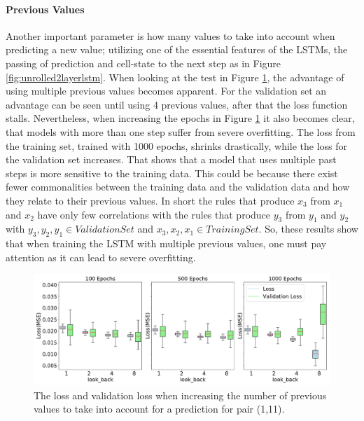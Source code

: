 \paragraph{Previous Values}
Another important parameter is how many values to take into account when predicting a new value; utilizing one of the essential features of the LSTMs, the passing of prediction and cell-state to the next step as in Figure \ref{fig:unrolled2layerlstm}.
When looking at the test in Figure \ref{fig:experiment_2}, the advantage of using multiple previous values becomes apparent.
For the validation set an advantage can be seen until using 4 previous values, after that the loss function stalls.
Nevertheless, when increasing the epochs in Figure \ref{fig:experiment_2} it also becomes clear, that models with more than one step suffer from severe overfitting.
The loss from the training set, trained with 1000 epochs, shrinks drastically, while the loss for the validation set increases.
That shows that a model that uses multiple past steps is more sensitive to the training data.
This could be because there exist fewer commonalities between the training data and the validation data and how they relate to their previous values.
In short the rules that produce $x_3$ from $x_1$ and $x_2$ have only few correlations with the rules that produce $y_3$ from $y_1$ and $y_2$ with $y_3,y_2,y_1\in Validation Set$ and $x_3,x_2,x_1\in Training Set$.
So, these results show that when training the LSTM with multiple previous values, one must pay attention as it can lead to severe overfitting.
\begin{figure}
	\centering
	\includegraphics[width=1\linewidth]{Pictures/Results/experiment_2_1_1}
	\caption{The loss and validation loss when increasing the number of previous values to take into 
		account for a prediction for pair (1,11).}
	\label{fig:experiment_2}
\end{figure}

